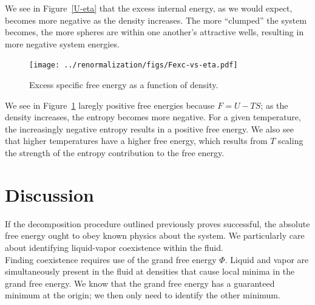 \documentclass[12pt]{article}
\begin{document}
We see in Figure~\ref{U-eta} that the excess internal energy, as we would expect, becomes more negative as the density increases. The more ``clumped'' the system becomes, the more spheres are within one another's attractive wells, resulting in more negative system energies. 
\begin{figure}[h]
\centering
    \texttt{[image: ../renormalization/figs/Fexc-vs-eta.pdf]}
    \caption{Excess specific free energy as a function of density.}
    \label{F-eta}
\end{figure}
We see in Figure~\ref{F-eta} laregly positive free energies because $F = U -TS$; as the density increases, the entropy becomes more negative. For a given temperature, the increasingly negative entropy results in a positive free energy. We also see that higher temperatures have a higher free energy, which results from $T$ scaling the strength of the entropy contribution to the free energy.\\



\section{Discussion}
If the decomposition procedure outlined previously proves successful, the absolute free energy ought to obey known physics about the system.
We particularly care about identifying liquid-vapor coexistence within the fluid. \\

Finding coexistence requires use of the grand free energy $\Phi$. Liquid and vapor are simultaneously present in the fluid at densities that cause local minima in the grand free energy. We know that the grand free energy has a guaranteed minimum at the origin; we then only need to identify the other minimum.  \\
\end{document}
